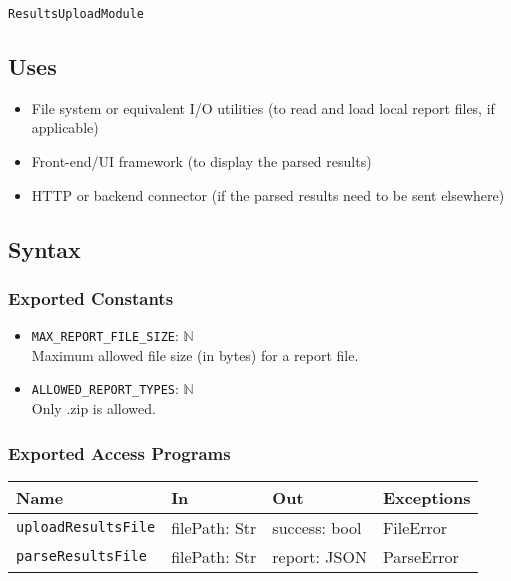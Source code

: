 \documentclass[12pt, titlepage]{article}
\begin{document}
\texttt{ResultsUploadModule}

\subsection{Uses}

\begin{itemize}
    \item File system or equivalent I/O utilities (to read and load local report files, if applicable)
    \item Front-end/UI framework (to display the parsed results)
    \item HTTP or backend connector (if the parsed results need to be sent elsewhere)
\end{itemize}

\subsection{Syntax}

\subsubsection{Exported Constants}

\begin{itemize}
    \item \texttt{MAX\_REPORT\_FILE\_SIZE}: $\mathbb{N}$ \\
     Maximum allowed file size (in bytes) for a report file.
    \item \texttt{ALLOWED\_REPORT\_TYPES}: $\mathbb{N}$ \\
     Only .zip is allowed.
\end{itemize}

\subsubsection{Exported Access Programs}

\begin{center}
\begin{tabular}{p{5cm} p{3.5cm} p{3.5cm} p{2cm}}
\hline
\textbf{Name} & \textbf{In} & \textbf{Out} & \textbf{Exceptions} \\
\hline
\texttt{uploadResultsFile} & filePath: Str & success: bool & FileError \\
\texttt{parseResultsFile} & filePath: Str & report: JSON & ParseError \\
\hline
\end{tabular}
\end{center}
\end{document}
